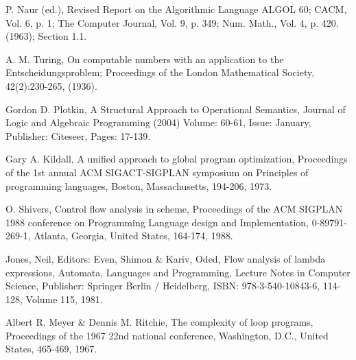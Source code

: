 \begin{thebibliography}{99}


P. Naur (ed.), Revised Report on the Algorithmic Language ALGOL 60; CACM, Vol.
6, p. 1; The Computer Journal, Vol. 9, p. 349; Num. Math., Vol. 4, p. 420.
(1963); Section 1.1.


A. M. Turing, On computable numbers with an application to the
Entscheidungsproblem; Proceedings of the London Mathematical Society,
42(2):230-265, (1936).


Gordon D. Plotkin, A Structural Approach to Operational Semantics, Journal of
Logic and Algebraic Programming (2004) Volume: 60-61, Issue: January,
Publisher: Citeseer, Pages: 17-139.


Gary A. Kildall, A unified approach to global program optimization, Proceedings
of the 1st annual ACM SIGACT-SIGPLAN symposium on Principles of programming
languages, Boston, Massachusetts, 194-206, 1973.


O. Shivers, Control flow analysis in scheme, Proceedings of the ACM SIGPLAN
1988 conference on Programming Language design and Implementation,
0-89791-269-1, Atlanta, Georgia, United States, 164-174, 1988.


Jones, Neil, Editors: Even, Shimon \& Kariv, Oded, Flow analysis of lambda
expressions, Automata, Languages and Programming, Lecture Notes in Computer
Science, Publisher: Springer Berlin / Heidelberg, ISBN: 978-3-540-10843-6,
114-128, Volume 115, 1981.


Albert R. Meyer \& Dennis M. Ritchie, The complexity of loop programs,
Proceedings of the 1967 22nd national conference, Washington, D.C., United
States, 465-469, 1967.

\end{thebibliography}
